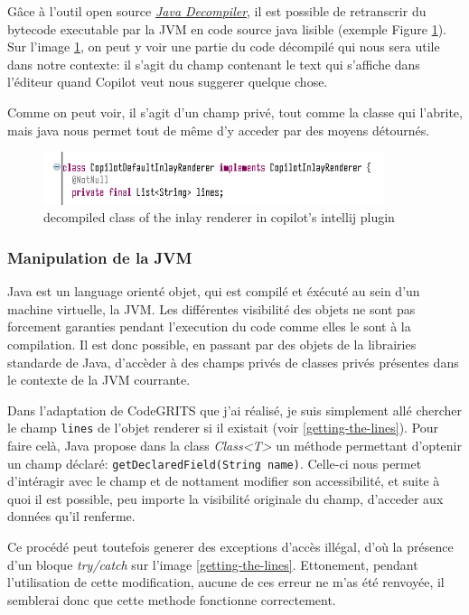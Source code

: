 Gâce à l'outil open source \emph{\href{https://java-decompiler.github.io/}{Java Decompiler}}, il est possible de retranscrir du bytecode executable par la JVM en code source java lisible (exemple Figure \ref{copilot-inlay-renderer}).
Sur l'image \ref{copilot-inlay-renderer}, on peut y voir une partie du code décompilé qui nous sera utile dans notre contexte: il s'agit du champ contenant le text qui s'affiche dans l'éditeur
quand Copilot veut nous suggerer quelque chose.

Comme on peut voir, il s'agit d'un champ privé, tout comme la classe qui l'abrite, mais java nous permet tout de même d'y acceder par des moyens détournés.

\begin{figure}
  \centering
  \includegraphics[width=10cm]{images/copilot-renderer-class.png}
  \caption{decompiled class of the inlay renderer in copilot's intellij plugin}
  \label{copilot-inlay-renderer}
\end{figure}


\subsubsection{Manipulation de la JVM}

Java est un language orienté objet, qui est compilé et éxécuté au sein d'un machine virtuelle, la JVM.
Les différentes visibilité des objets ne sont pas forcement garanties pendant l'execution du code comme elles le sont à la compilation.
Il est donc possible, en passant par des objets de la librairies standarde de Java, d'accèder à des champs privés de classes privés présentes
dans le contexte de la JVM courrante.

Dans l'adaptation de CodeGRITS que j'ai réalisé, je suis simplement allé chercher le champ \lstinline{lines} de l'objet renderer si il existait (voir \ref{getting-the-lines}).
Pour faire celà, Java propose dans la class \emph{Class<T>} un méthode permettant d'optenir un champ déclaré: \lstinline{getDeclaredField(String name)}.
Celle-ci nous permet d'intéragir avec le champ et de nottament modifier son accessibilité, et suite à quoi il est possible, peu importe la visibilité originale du champ,
d'acceder aux données qu'il renferme.

Ce procédé peut toutefois generer des exceptions d'accès illégal, d'où la présence d'un bloque \emph{try/catch} sur l'image \ref{getting-the-lines}.
Ettonement, pendant l'utilisation de cette modification, aucune de ces erreur ne m'as été renvoyée, il semblerai donc que cette methode fonctionne correctement.

